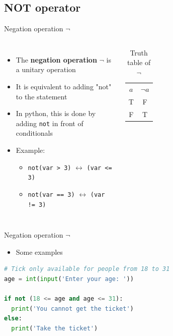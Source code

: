 \documentclass[10pt,xcolor={table,dvipsnames},t]{beamer}
\begin{document}
\subsection{NOT operator}
\begin{frame}{Negation operation $\neg$}
  \begin{columns}
    \begin{itemize}
      \item The \textbf{negation operation} $\neg$ is a unitary operation 
      \item It is equivalent to adding "not" to the statement 
      \item In python, this is done by adding \texttt{not} in front of conditionals
      \item Example:
      \begin{itemize}
        \item \texttt{not(var > 3)} $\leftrightarrow$ \texttt{(var <= 3)}
        \item \texttt{not(var == 3)} $\leftrightarrow$ \texttt{(var != 3)}
      \end{itemize}
    \end{itemize}
    \begin{table}[]
      \begin{tabular}{cc}
      $a$ & $\neg a$  \\
      T & F \\
      F & T
      \end{tabular}
      \caption{Truth table of $\neg$}
      \end{table}
  \end{columns}
\end{frame}

\begin{frame}[fragile]{Negation operation $\neg$}
  \begin{itemize}
    \item Some examples
  \end{itemize}
\begin{lstlisting}[language=python]
# Tick only available for people from 18 to 31
age = int(input('Enter your age: '))

if not (18 <= age and age <= 31):
  print('You cannot get the ticket')
else:
  print('Take the ticket')
\end{lstlisting}
\end{frame}
\end{document}
